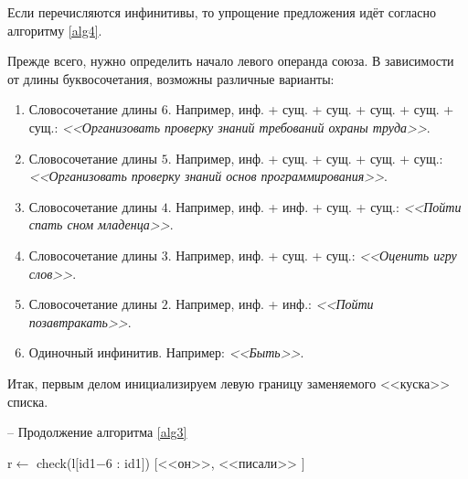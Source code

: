 \documentclass[main]{subfiles}
\begin{document}
Если перечисляются инфинитивы, то упрощение предложения идёт согласно алгоритму \ref{alg4}.

Прежде всего, нужно определить начало левого операнда союза. В зависимости от длины буквосочетания, возможны различные варианты:
\begin{enumerate}
	\item Словосочетание длины $6$. Например, инф. + сущ. + сущ. + сущ. + сущ. + сущ.: \textit{<<Организовать проверку знаний требований охраны труда>>}.
	\item Словосочетание длины $5$. Например, инф. + сущ. + сущ. + сущ. + сущ.: \textit{<<Организовать проверку знаний основ программирования>>}.
	\item Словосочетание длины $4$. Например, инф. + инф. + сущ. + сущ.: \textit{<<Пойти спать сном младенца>>}.
	\item Словосочетание длины $3$. Например, инф. + сущ. + сущ.: \textit{<<Оценить игру слов>>}.
	\item Словосочетание длины $2$. Например, инф. + инф.: \textit{<<Пойти позавтракать>>}.
	\item Одиночный инфинитив. Например: \textit{<<Быть>>}.
\end{enumerate}
Итак, первым делом инициализируем левую границу заменяемого <<куска>> списка.
\begin{algorithm}
	\caption{-- Продолжение алгоритма \ref{alg3}}\label{alg4}
	\begin{algorithmic}[1]
		 
		\State r$\gets$ check(l$[$id1$-6$ : id1$]$)
		\State \Return $[$<<он>>, <<писали>> $]$ 
	\end{algorithmic}
\end{algorithm}
\end{document}
